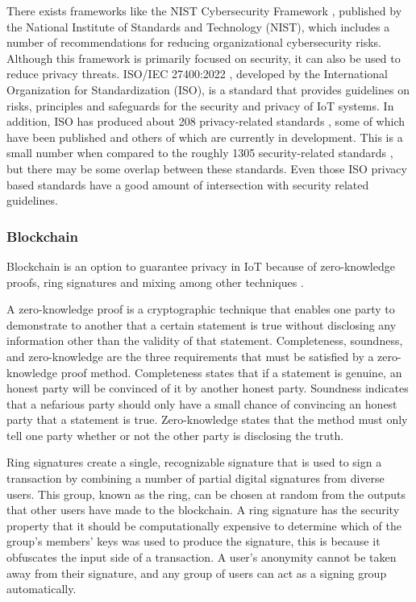 There exists frameworks like the NIST Cybersecurity Framework \cite{barrett2018framework},
published by the National Institute of Standards and Technology (NIST),
which includes a number of recommendations for reducing organizational
cybersecurity risks. Although this framework is primarily focused on
security, it can also be used to reduce privacy threats.
ISO/IEC 27400:2022 \cite{iso2022cybersecurity}, developed by the International
Organization for Standardization (ISO), is a standard that provides
guidelines on risks, principles and safeguards for the security and
privacy of IoT systems. In addition, ISO has produced about 208 privacy-related
standards \cite{iso2023privacysearch}, some of which have been published
and others of which are currently in development. This is a small number
when compared to the roughly 1305 security-related standards \cite{iso2023securitysearch},
but there may be some overlap between these standards. Even those ISO privacy
based standards have a good amount of intersection with security related
guidelines.

\subsubsection{Blockchain}

Blockchain is an option to guarantee privacy in IoT because of zero-knowledge
proofs\cite{sun2021survey}, ring signatures \cite{mercer2016privacy} and mixing \cite{stone2021trustless}
among other techniques \cite{zhang2019security}.

A zero-knowledge proof is a cryptographic technique that enables one party
to demonstrate to another that a certain statement is true without disclosing
any information other than the validity of that statement. Completeness, soundness,
and zero-knowledge are the three requirements that must be satisfied by a
zero-knowledge proof method. Completeness states that if a
statement is genuine, an honest party will be convinced of it by another honest
party. Soundness indicates that a nefarious party should only have a small chance
of convincing an honest party that a statement is true. Zero-knowledge states
that the method must only tell one party whether or not the other party is
disclosing the truth.

Ring signatures create a single, recognizable signature that is used to sign
a transaction by combining a number of partial digital signatures from diverse
users. This group, known as the ring, can be chosen at random from the outputs
that other users have made to the blockchain. A ring signature has the security
property that it should be computationally expensive to determine which
of the group's members' keys was used to produce the signature, this is because
it obfuscates the input side of a transaction. A user's anonymity cannot
be taken away from their signature, and any group of users can act as a signing
group automatically.

